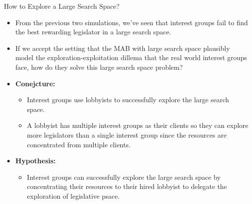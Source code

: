 \documentclass{beamer}
\begin{document}
	\begin{frame}{How to Explore a Large Search Space?}
		\begin{itemize}
			\item From the previous two simulations, we've seen that interest groups fail to find the best rewarding legislator in a large search space.
			\item If we accept the setting that the MAB with large search space plausibly model the exploration-exploitation dillema that the real world interest groups face, how do they solve this large search space problem?
			\item \textbf{Conejcture: }
				\begin{itemize}
				\item Interest groups use lobbyists to successfully explore the large search space. 
				\item A lobbyist has multiple interest groups as their clients so they can explore more legislators than a single interest group since the resources are concentrated from multiple clients.
			\end{itemize}
			\item \textbf{Hypothesis: }
			\begin{itemize}
			\item Interest groups can successfully explore the large search space by concentrating their resources to their hired lobbyist to delegate the exploration of legislative psace.
			\end{itemize}
	\end{itemize}
	\end{frame}
\end{document}
